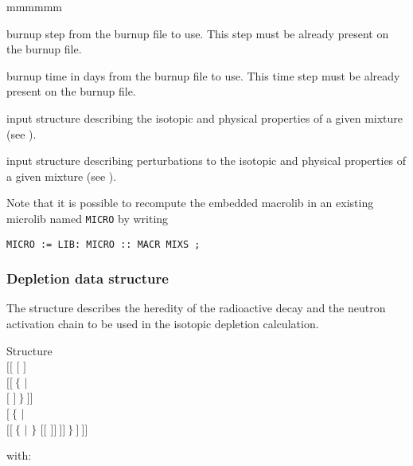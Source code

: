 \begin{ListeDeDescription}{mmmmmm}
\item[\dusa{iburn}] burnup step from the burnup file to use. This step must be
already present on the burnup file.

\item[\dusa{tburn}] burnup time in days from the burnup file to use. This time
step must be already present on the burnup file.

\item[\dstr{descmix1}] input structure describing the
isotopic and physical properties of a given mixture (see ).

\item[\dstr{descmix2}] input structure describing perturbations to the
isotopic and physical properties of a given mixture (see ).


\end{ListeDeDescription}

Note that it is possible to recompute the embedded macrolib in an existing microlib
named {\tt MICRO} by writing
\begin{verbatim}
MICRO := LIB: MICRO :: MACR MIXS ;
\end{verbatim}

\clearpage

\subsubsection{Depletion data structure}\label{sect:descdepl}

The structure  describes the heredity of the radioactive decay
and the neutron activation chain to be used in the isotopic depletion
calculation.
\begin{DataStructure}{Structure }
 \\
$[[$  $[$  $]$ \\
\hskip 1.0cm $[[~\{$   $|$ \\
\hskip 2.0cm  $[$  $]~\}~]]$ \\
\hskip 1.0cm $[~\{$  $|$ \\
\hskip 2.0cm  $[[~\{$  $|$  $\}$
$[[$   $]]~]]~\}~]~]]$\\
\end{DataStructure}

\noindent
with:

